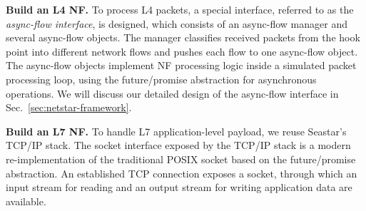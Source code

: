 





\textbf{Build an L4 NF.} To process L4 packets, a special interface, referred to as the {\em async-flow interface}, is designed, which consists of an async-flow manager and several async-flow objects. %
The manager classifies received packets from the hook point into different network flows and pushes each flow to one async-flow object. The async-flow objects implement NF processing logic inside a simulated packet processing loop, using the future/promise abstraction for asynchronous operations. We will discuss our detailed design of the async-flow interface in Sec.~\ref{sec:netstar-framework}.

\textbf{Build an L7 NF.} To handle L7 application-level payload, we reuse Seastar's TCP/IP stack. The socket interface exposed by the TCP/IP stack is a modern re-implementation of the traditional POSIX socket based on the future/promise abstraction. An established TCP connection exposes a socket, through which an input stream for reading and an output stream for writing application data are available. %

